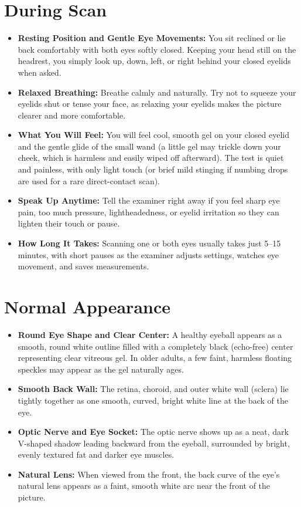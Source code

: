 \section{During Scan}
\begin{itemize}
    \item \textbf{Resting Position and Gentle Eye Movements:} You sit reclined or lie back comfortably with both eyes softly closed. Keeping your head still on the headrest, you simply look up, down, left, or right behind your closed eyelids when asked.
    \item \textbf{Relaxed Breathing:} Breathe calmly and naturally. Try not to squeeze your eyelids shut or tense your face, as relaxing your eyelids makes the picture clearer and more comfortable.
    \item \textbf{What You Will Feel:} You will feel cool, smooth gel on your closed eyelid and the gentle glide of the small wand (a little gel may trickle down your cheek, which is harmless and easily wiped off afterward). The test is quiet and painless, with only light touch (or brief mild stinging if numbing drops are used for a rare direct-contact scan).
    \item \textbf{Speak Up Anytime:} Tell the examiner right away if you feel sharp eye pain, too much pressure, lightheadedness, or eyelid irritation so they can lighten their touch or pause.
    \item \textbf{How Long It Takes:} Scanning one or both eyes usually takes just 5--15 minutes, with short pauses as the examiner adjusts settings, watches eye movement, and saves measurements.
\end{itemize}

\section{Normal Appearance}
\begin{itemize}
    \item \textbf{Round Eye Shape and Clear Center:} A healthy eyeball appears as a smooth, round white outline filled with a completely black (echo-free) center representing clear vitreous gel. In older adults, a few faint, harmless floating speckles may appear as the gel naturally ages.
    \item \textbf{Smooth Back Wall:} The retina, choroid, and outer white wall (sclera) lie tightly together as one smooth, curved, bright white line at the back of the eye.
    \item \textbf{Optic Nerve and Eye Socket:} The optic nerve shows up as a neat, dark V-shaped shadow leading backward from the eyeball, surrounded by bright, evenly textured fat and darker eye muscles.
    \item \textbf{Natural Lens:} When viewed from the front, the back curve of the eye's natural lens appears as a faint, smooth white arc near the front of the picture.
\end{itemize}

